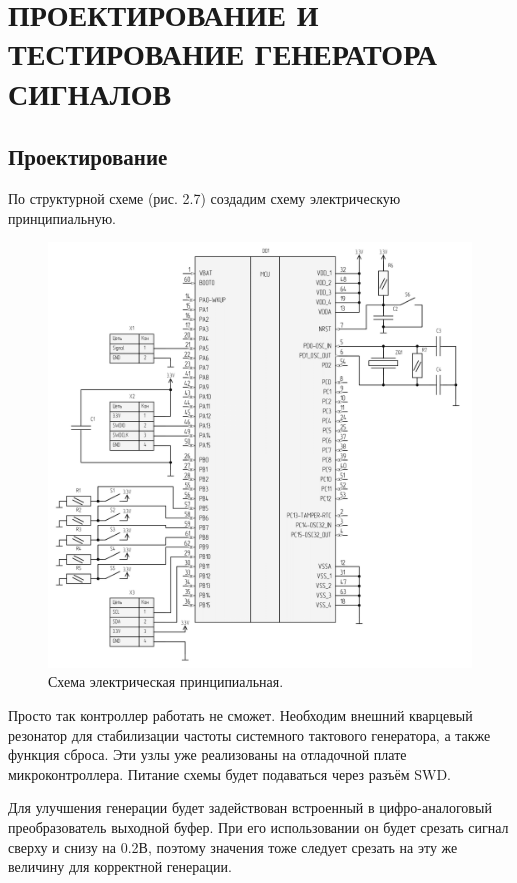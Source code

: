 \chapter{ПРОЕКТИРОВАНИЕ И ТЕСТИРОВАНИЕ ГЕНЕРАТОРА СИГНАЛОВ}
\section{Проектирование}
	По структурной схеме (рис. 2.7) создадим схему электрическую принципиальную. 
	
	\begin{figure}[H]
    \centering
    \includegraphics[width=1\textwidth]{../image/scheme-cropped.png}
    \caption{Схема электрическая принципиальная.}
	\end{figure}
	
	Просто так контроллер работать не сможет. Необходим внешний кварцевый резонатор для стабилизации частоты системного тактового генератора, а также функция сброса. Эти узлы уже реализованы на отладочной плате микроконтроллера. Питание схемы будет подаваться через разъём SWD.
		
	Для улучшения генерации будет задействован встроенный в цифро-аналоговый преобразователь выходной буфер. При его использовании он будет срезать сигнал сверху и снизу на 0.2В, поэтому значения тоже следует срезать на эту же величину для корректной генерации.
	
